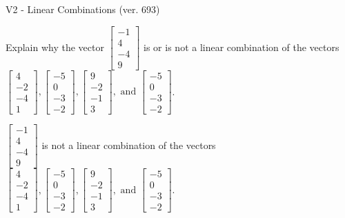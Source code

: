 \begin{exercise}
  \begin{exerciseTitle}V2 - Linear Combinations (ver. 693)\end{exerciseTitle}
  \begin{exerciseStatement}
    Explain why the vector \(\left[\begin{array}{c}
-1 \\
4 \\
-4 \\
9
\end{array}\right]\)  is or is not a linear 
	combination of the vectors \(\left[\begin{array}{c}
4 \\
-2 \\
-4 \\
1
\end{array}\right] , \left[\begin{array}{c}
-5 \\
0 \\
-3 \\
-2
\end{array}\right] , \left[\begin{array}{c}
9 \\
-2 \\
-1 \\
3
\end{array}\right] , \text{ and } \left[\begin{array}{c}
-5 \\
0 \\
-3 \\
-2
\end{array}\right]\).
	


  \end{exerciseStatement}
  \begin{exerciseAnswer}
   \(\left[\begin{array}{c}
-1 \\
4 \\
-4 \\
9
\end{array}\right]\) 
  	 is not  
	a linear combination of the vectors \(\left[\begin{array}{c}
4 \\
-2 \\
-4 \\
1
\end{array}\right] , \left[\begin{array}{c}
-5 \\
0 \\
-3 \\
-2
\end{array}\right] , \left[\begin{array}{c}
9 \\
-2 \\
-1 \\
3
\end{array}\right] , \text{ and } \left[\begin{array}{c}
-5 \\
0 \\
-3 \\
-2
\end{array}\right]\).


\end{exerciseAnswer}
\end{exercise}
